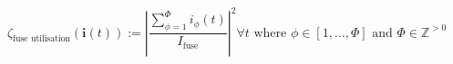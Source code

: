 \begin{equation}
	\zeta_\text{fuse utilisation}(\textbf{i}(t)) :=%
	\left|\frac{\sum_{\phi=1}^{\Phi}{i_\phi(t)}}{I_\text{fuse}}\right|^2 \forall t%
	\text{ where } \phi \in [1, \dots, \Phi]%
	\text{ and } \Phi \in \mathbb{Z}^{>0}
	\label{ch1:equ:fuse-utilisation}
\end{equation}